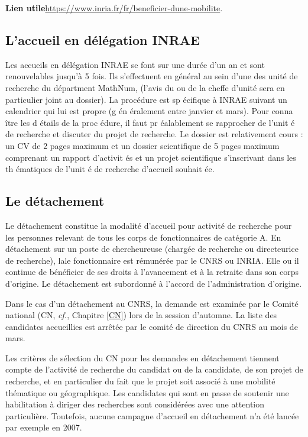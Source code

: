\textbf{Lien utile\hspace{0.5em}}\url{https://www.inria.fr/fr/beneficier-dune-mobilite}.

\subsection*{L'accueil en d\'el\'egation INRAE}

Les accueils en d\'el\'egation INRAE se font sur une dur\'ee d'un an et sont renouvelables jusqu'à 5 fois. Ils s'effectuent en
g\'en\'eral au sein d'une des unit\'e de recherche du d\'epartment MathNum, 
(l'avis du ou de la chef\mp fe d'unit\'e sera en particulier joint au dossier). La proc\'edure est sp \'ecifique à INRAE suivant un calendrier qui lui est propre (g \'en \'eralement entre janvier et mars). Pour conna \^itre les d \'etails de la proc \'edure, il faut pr \'ealablement se rapprocher de l'unit \'e de recherche et discuter du projet de recherche. Le dossier est relativement cours : un CV de 2 pages maximum et un dossier scientifique de 5 pages maximum comprenant un rapport d'activit \'es et un projet scientifique s'inscrivant dans les th \'ematiques de l'unit \'e de recherche d'accueil souhait \'ee.


\subsection{Le d\'etachement}
\label{detachement}


Le d\'etachement constitue la modalit\'e d'accueil pour activit\'e
de recherche pour les personnes relevant de tous les corps de
fonctionnaires de cat\'egorie A. En d\'etachement sur un poste de
chercheur\mp euse (charg\'e\mp e de recherche ou directeur\mp ice de recherche), la\mp le
fonctionnaire est r\'emun\'er\'e\mp e par le CNRS ou INRIA. Elle ou il continue
de b\'en\'eficier de ses droits \`a l'avancement et \`a la retraite
dans son corps d'origine. Le d\'etachement est subordonn\'e \`a
l'accord de l'administration d'origine.

Dans le cas d'un d\'etachement au CNRS, la demande est examin\'ee
par le Comit\'e national (CN, {\em cf.}, Chapitre \ref{CN}) lors de la session
d'automne. La liste des candidat\mp e\mp s accueilli\mp e\mp s est arr\^et\'ee par le
comit\'e de direction du CNRS au mois de mars.

Les crit\`eres de s\'election du CN pour les demandes en
d\'etachement tiennent compte de l'activit\'e de recherche du
candidat ou de la candidate, de son projet de recherche, et en particulier du fait que
le projet soit associ\'e \`a une mobilit\'e th\'ematique ou
g\'eographique. Les candidat\mp e\mp s qui sont en passe de soutenir une
habilitation \`a diriger des recherches sont consid\'er\'e\mp e\mp s avec une
attention particuli\`ere. Toutefois, aucune campagne d'accueil en
d\'etachement n'a \'et\'e lanc\'ee par exemple en 2007.

